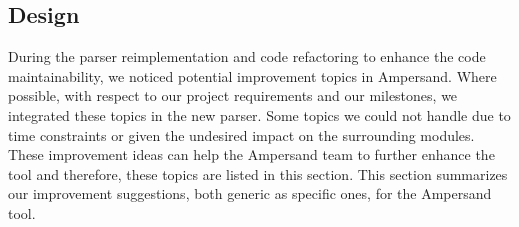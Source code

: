 
\subsection{Design}
\label{recommendations:design}
During the parser reimplementation and code refactoring to enhance the code maintainability, we noticed potential improvement topics in Ampersand.
Where possible, with respect to our project requirements and our milestones, we integrated these topics in the new parser.
Some topics we could not handle due to time constraints or given the undesired impact on the surrounding modules.
These improvement ideas can help the Ampersand team to further enhance the tool and therefore, these topics are listed in this section.
This section summarizes our improvement suggestions, both generic as specific ones, for the Ampersand tool.

